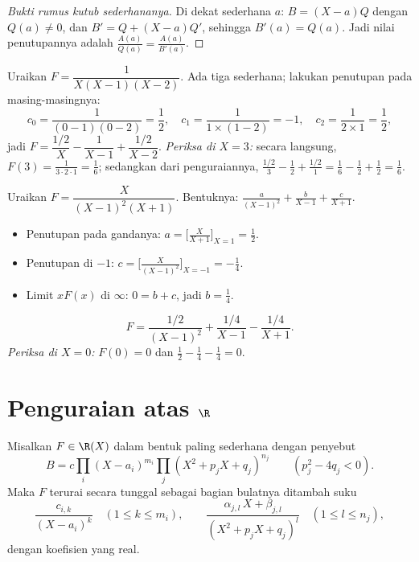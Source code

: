 \begin{proof}[Bukti rumus kutub sederhananya]
Di dekat  sederhana $a$: $B = (X - a) Q$ dengan $Q(a) \neq 0$, dan $B' =
Q + (X - a) Q'$, sehingga $B'(a) = Q(a)$. Jadi nilai penutupannya adalah
$\frac{A(a)}{Q(a)} = \frac{A(a)}{B'(a)}$.
\end{proof}

\begin{example}\label{ex:b1:fractions:simple}
Uraikan $F = \dfrac{1}{X(X-1)(X-2)}$. Ada tiga  sederhana; lakukan penutupan
pada masing-masingnya:
\[
c_0 = \frac{1}{(0-1)(0-2)} = \frac12,
\quad
c_1 = \frac{1}{1 \times (1 - 2)} = -1,
\quad
c_2 = \frac{1}{2 \times 1} = \frac12,
\]
jadi $F = \dfrac{1/2}{X} - \dfrac{1}{X-1} + \dfrac{1/2}{X-2}$.
\emph{Periksa di $X = 3$:} secara langsung, $F(3) = \frac{1}{3\cdot2\cdot1} =
\frac16$; sedangkan dari penguraiannya, $\frac{1/2}{3} - \frac{1}{2} +
\frac{1/2}{1} = \frac16 - \frac12 + \frac12 = \frac16$.
\end{example}

\begin{example}\label{ex:b1:fractions:multiple}
Uraikan $F = \dfrac{X}{(X-1)^2 (X+1)}$. Bentuknya:
$\frac{a}{(X-1)^2} + \frac{b}{X-1} + \frac{c}{X+1}$.
\begin{itemize}
  \item Penutupan pada  gandanya: $a = \bigl[\frac{X}{X+1}\bigr]_{X=1}
        = \frac12$.
  \item Penutupan di $-1$: $c = \bigl[\frac{X}{(X-1)^2}\bigr]_{X=-1} =
        -\frac14$.
  \item Limit $xF(x)$ di $\infty$: $0 = b + c$, jadi $b = \frac14$.
\end{itemize}
\[
F = \frac{1/2}{(X-1)^2} + \frac{1/4}{X-1} - \frac{1/4}{X+1} .
\]
\emph{Periksa di $X = 0$:} $F(0) = 0$ dan $\frac12 - \frac14 - \frac14
= 0$.
\end{example}

\section{Penguraian atas $\R$}

\begin{theorem}\label{thm:b1:fractions:real}
Misalkan $F \in \R(X)$ dalam bentuk paling sederhana dengan penyebut
\[
B = c \prod_i (X - a_i)^{m_i} \prod_j (X^2 + p_j X + q_j)^{n_j}
\qquad (p_j^2 - 4q_j < 0).
\]
Maka $F$ terurai secara tunggal sebagai bagian bulatnya ditambah suku
\[
\frac{c_{i,k}}{(X - a_i)^k} \quad (1 \leq k \leq m_i),
\qquad
\frac{\alpha_{j,l}\, X + \beta_{j,l}}{(X^2 + p_j X + q_j)^{l}}
\quad (1 \leq l \leq n_j),
\]
dengan koefisien yang real.
\end{theorem}

